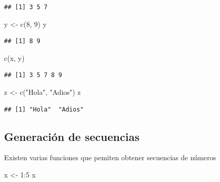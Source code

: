 \documentclass[
]{book}
\newenvironment{Shaded}{\begin{snugshade}}{\end{snugshade}}
\newcommand{\DecValTok}[1]{\textcolor[rgb]{0.00,0.00,0.81}{#1}}
\newcommand{\FunctionTok}[1]{\textcolor[rgb]{0.00,0.00,0.00}{#1}}
\newcommand{\NormalTok}[1]{#1}
\newcommand{\OtherTok}[1]{\textcolor[rgb]{0.56,0.35,0.01}{#1}}
\newcommand{\SpecialCharTok}[1]{\textcolor[rgb]{0.00,0.00,0.00}{#1}}
\newcommand{\StringTok}[1]{\textcolor[rgb]{0.31,0.60,0.02}{#1}}
\theoremstyle{break}
\theoremstyle{nonumberplain}
\begin{document}
\begin{verbatim}
## [1] 3 5 7
\end{verbatim}

\begin{Shaded}
\begin{Highlighting}[]
\NormalTok{y }\OtherTok{\textless{}{-}} \FunctionTok{c}\NormalTok{(}\DecValTok{8}\NormalTok{, }\DecValTok{9}\NormalTok{)}
\NormalTok{y}
\end{Highlighting}
\end{Shaded}

\begin{verbatim}
## [1] 8 9
\end{verbatim}

\begin{Shaded}
\begin{Highlighting}[]
\FunctionTok{c}\NormalTok{(x, y)}
\end{Highlighting}
\end{Shaded}

\begin{verbatim}
## [1] 3 5 7 8 9
\end{verbatim}

\begin{Shaded}
\begin{Highlighting}[]
\NormalTok{z }\OtherTok{\textless{}{-}} \FunctionTok{c}\NormalTok{(}\StringTok{"Hola"}\NormalTok{, }\StringTok{"Adios"}\NormalTok{)}
\NormalTok{z}
\end{Highlighting}
\end{Shaded}

\begin{verbatim}
## [1] "Hola"  "Adios"
\end{verbatim}

\hypertarget{generaciuxf3n-de-secuencias}{%
\subsection{Generación de secuencias}\label{generaciuxf3n-de-secuencias}}

Existen varias funciones que pemiten obtener secuencias de números

\begin{Shaded}
\begin{Highlighting}[]
\NormalTok{x }\OtherTok{\textless{}{-}} \DecValTok{1}\SpecialCharTok{:}\DecValTok{5}
\NormalTok{x}
\end{Highlighting}
\end{Shaded}
\end{document}
